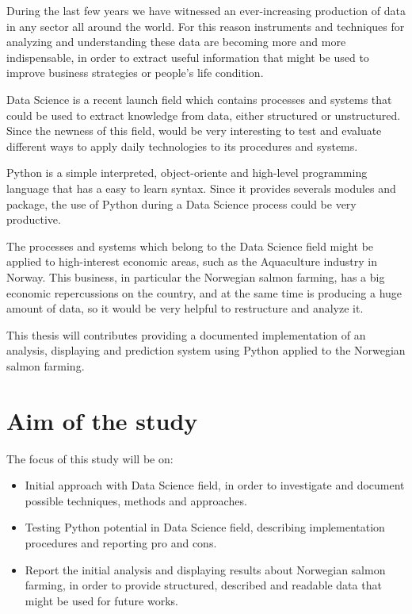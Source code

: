

During the last few years we have witnessed an ever-increasing production of data in any sector all around the world.
For this reason instruments and techniques for analyzing and understanding these data are becoming more and more indispensable, in order to extract useful information that might be used to improve business strategies or people's life condition.

Data Science is a recent launch field which contains processes and systems that could be used to extract knowledge from data, either structured or unstructured. Since the newness of this field, would be very interesting to test and evaluate different ways to apply daily technologies to its procedures and systems.

Python is a simple interpreted, object-oriente and high-level programming language that has a easy to learn syntax.
Since it provides severals modules and package, the use of Python during a Data Science process could be very productive.

The processes and systems which belong to the Data Science field might be applied to high-interest  economic areas, such as the Aquaculture industry in Norway.
This business, in particular the Norwegian salmon farming, has a big economic repercussions on the country, and at the same time is producing a huge amount of data, so it would be very helpful to restructure and analyze it.

This thesis will contributes providing a documented implementation of an analysis, displaying and prediction system using Python applied to the Norwegian salmon farming.

\newpage

\section{Aim of the study}
\vspace{-5mm}
The focus of this study will be on:
\begin{itemize} 
 \item Initial approach with Data Science field, in order to investigate and document possible techniques, methods and approaches.
 
 \item Testing Python potential in Data Science field, describing implementation procedures and reporting pro and cons. 
 
 \item Report the initial analysis and displaying results about Norwegian salmon farming, in order to provide structured, described and readable data that might be used for future works.
\end{itemize}


